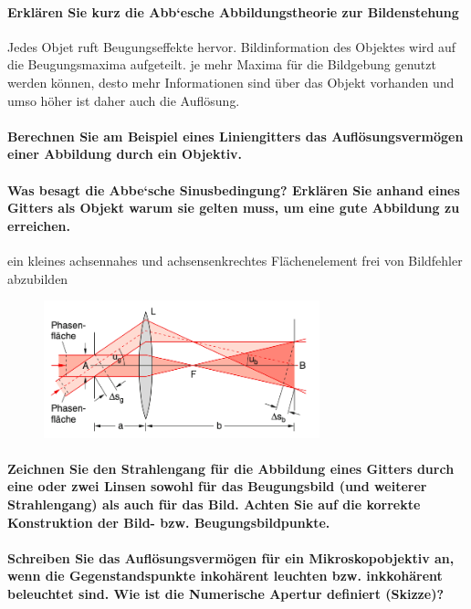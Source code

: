 \documentclass[a4paper, 11pt, parskip=half]{scrartcl}
\begin{document}
\paragraph{Erklären Sie kurz die Abb‘esche Abbildungstheorie zur Bildenstehung}

Jedes Objet ruft Beugungseffekte hervor. Bildinformation des Objektes wird auf die Beugungsmaxima aufgeteilt. je mehr Maxima für die Bildgebung genutzt werden können, desto mehr Informationen sind über das Objekt vorhanden und umso höher ist daher auch die Auflösung.

\paragraph{Berechnen Sie am Beispiel eines Liniengitters das Auflösungsvermögen einer Abbildung
durch ein Objektiv.}

\paragraph{Was besagt die Abbe‘sche Sinusbedingung? Erklären Sie anhand eines Gitters als Objekt
warum sie gelten muss, um eine gute Abbildung zu erreichen.}

ein kleines achsennahes und achsensenkrechtes Flächenelement frei von Bildfehler abzubilden

\begin{figure}[H]
    \centering
    \includegraphics[width=8cm]{image/22/opt23} 
\end{figure}


\paragraph{Zeichnen Sie den Strahlengang für die Abbildung eines Gitters durch eine oder zwei Linsen
sowohl für das Beugungsbild (und weiterer Strahlengang) als auch für das Bild. Achten Sie
auf die korrekte Konstruktion der Bild- bzw. Beugungsbildpunkte.}

\paragraph{Schreiben Sie das Auflösungsvermögen für ein Mikroskopobjektiv an, wenn die
Gegenstandspunkte inkohärent leuchten bzw. inkkohärent beleuchtet sind. Wie ist die Numerische
Apertur definiert (Skizze)?}
\end{document}
